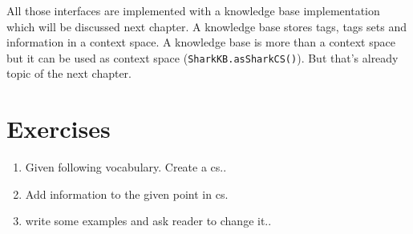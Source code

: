 All those interfaces are implemented with a knowledge base implementation which will be discussed next chapter. A knowledge base stores tags, tags sets and information in a context space. A knowledge base is more than a context space but it can be used as context space ({\tt SharkKB.asSharkCS()}). But that's already topic of the next chapter.

\section{Exercises}
\begin{enumerate}
\item 
Given following vocabulary. Create a cs..
\item 
Add information to the given point in cs.
\item 
write some examples and ask reader to change it..
\end{enumerate}
